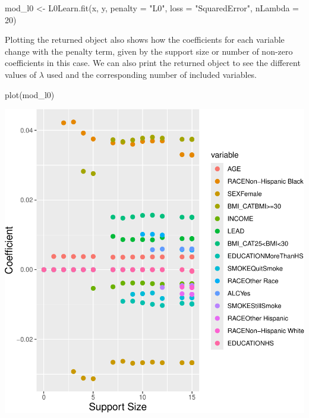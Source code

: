 \documentclass[
  letterpaper,
]{latex/krantz}
\makeatletter
\newenvironment{Shaded}{\begin{snugshade}}{\end{snugshade}}
\newcommand{\AttributeTok}[1]{\textcolor[rgb]{0.40,0.45,0.13}{#1}}
\newcommand{\DecValTok}[1]{\textcolor[rgb]{0.68,0.00,0.00}{#1}}
\newcommand{\FunctionTok}[1]{\textcolor[rgb]{0.28,0.35,0.67}{#1}}
\newcommand{\NormalTok}[1]{\textcolor[rgb]{0.00,0.23,0.31}{#1}}
\newcommand{\OtherTok}[1]{\textcolor[rgb]{0.00,0.23,0.31}{#1}}
\newcommand{\StringTok}[1]{\textcolor[rgb]{0.13,0.47,0.30}{#1}}
\newenvironment{kframe}{%
\medskip{}
\setlength{\fboxsep}{.8em}
 \def\at@end@of@kframe{}%
 \ifinner\ifhmode%
  \def\at@end@of@kframe{\end{minipage}}%
  \begin{minipage}{\columnwidth}%
 \fi\fi%
 \def\FrameCommand##1{\hskip\@totalleftmargin \hskip-\fboxsep
 \colorbox{shadecolor}{##1}\hskip-\fboxsep
     \hskip-\linewidth \hskip-\@totalleftmargin \hskip\columnwidth}%
 \MakeFramed {\advance\hsize-\width
   \@totalleftmargin\z@ \linewidth\hsize
   \@setminipage}}%
 {\par\unskip\endMakeFramed%
 \at@end@of@kframe}
\renewenvironment{Shaded}{\begin{kframe}}{\end{kframe}}
\makeatother
\begin{document}
\begin{Shaded}
\begin{Highlighting}[]
\NormalTok{mod\_l0 }\OtherTok{\textless{}{-}} \FunctionTok{L0Learn.fit}\NormalTok{(x, y, }\AttributeTok{penalty =} \StringTok{"L0"}\NormalTok{, }\AttributeTok{loss =} \StringTok{"SquaredError"}\NormalTok{,}
                      \AttributeTok{nLambda =} \DecValTok{20}\NormalTok{)}
\end{Highlighting}
\end{Shaded}

Plotting the returned object also shows how the coefficients for each
variable change with the penalty term, given by the support size or
number of non-zero coefficients in this case. We can also print the
returned object to see the different values of \(\lambda\) used and the
corresponding number of included variables.

\begin{Shaded}
\begin{Highlighting}[]
\FunctionTok{plot}\NormalTok{(mod\_l0)}
\end{Highlighting}
\end{Shaded}

\begin{center}
\includegraphics[width=1\textwidth,height=\textheight]{book/model_selection_files/figure-pdf/unnamed-chunk-16-1.pdf}
\end{center}
\end{document}
